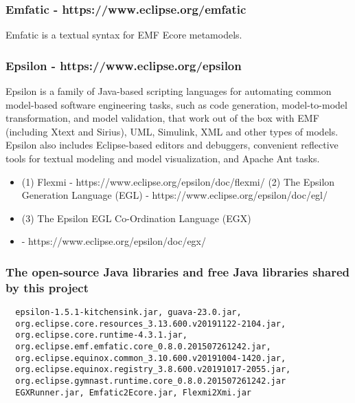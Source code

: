 \documentclass[12pt]{article}
\begin{document}
\subsubsection*{Emfatic - https://www.eclipse.org/emfatic }

Emfatic is a textual syntax for EMF Ecore metamodels.

\subsubsection*{Epsilon - https://www.eclipse.org/epsilon}

Epsilon is a family of Java-based scripting languages for automating common model-based software engineering tasks, such as code generation, model-to-model transformation, and model validation, that work out of the box with EMF (including Xtext and Sirius), UML, Simulink, XML and other types of models. Epsilon also includes Eclipse-based editors and debuggers, convenient reflective tools for textual modeling and model visualization, and Apache Ant tasks.

\begin{itemize}[label={}]
\itemsep0em
  \item (1) Flexmi - https://www.eclipse.org/epsilon/doc/flexmi/ (2) The Epsilon Generation Language (EGL) - https://www.eclipse.org/epsilon/doc/egl/ 
  \item (3) The Epsilon EGL Co-Ordination Language (EGX)
  \item - https://www.eclipse.org/epsilon/doc/egx/ 
\end{itemize} 




\subsubsection*{The open-source Java libraries and free Java libraries shared by this project}
\begin{lstlisting}
  epsilon-1.5.1-kitchensink.jar, guava-23.0.jar,
  org.eclipse.core.resources_3.13.600.v20191122-2104.jar,
  org.eclipse.core.runtime-4.3.1.jar,
  org.eclipse.emf.emfatic.core_0.8.0.201507261242.jar,
  org.eclipse.equinox.common_3.10.600.v20191004-1420.jar,
  org.eclipse.equinox.registry_3.8.600.v20191017-2055.jar,
  org.eclipse.gymnast.runtime.core_0.8.0.201507261242.jar
  EGXRunner.jar, Emfatic2Ecore.jar, Flexmi2Xmi.jar
\end{lstlisting}
\end{document}
